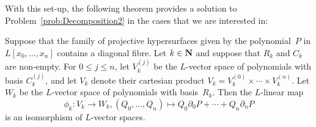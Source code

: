With this set-up, the following theorem provides a solution to 
Problem~\ref{prob:Decomposition2} in the cases that we are interested in:

\begin{thm} \label{thm:Isomorphism}
Suppose that the family of projective hypersurfaces given by the 
polynomial~$P$ in $L[x_0, \dotsc, x_n]$ contains a diagonal fibre.  
Let $k \in \mathbf{N}$ and suppose that $R_k$ and $C_k$ are non-empty.  For 
$0 \leq j \leq n$, let $V_k^{(j)}$ be the $L$-vector space of 
polynomials with basis $C_k^{(j)}$, and let $V_k$ denote their cartesian 
product $V_k = V_k^{(0)} \times \dotsb \times V_k^{(n)}$.  Let $W_k$ be 
the $L$-vector space of polynomials with basis~$R_k$.  Then the $L$-linear 
map 
\begin{equation}
\phi_k \colon V_k \to W_k, 
(Q_0, \dotsc, Q_n) \mapsto Q_0 \partial_0 P + \dotsb + Q_n \partial_n P
\end{equation}
is an isomorphism of $L$-vector spaces.
\end{thm}

